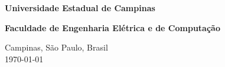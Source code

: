 \begin{titlepage}
\centering
    
{\large\textbf{Universidade Estadual de Campinas}
\par}
{\large\textbf{Faculdade de Engenharia Elétrica e de Computação}
\par}

\vspace{3.0cm}




\vfill


\vspace{3cm}

{\large
Campinas, São Paulo, Brasil\\
\today \par}
\end{titlepage}